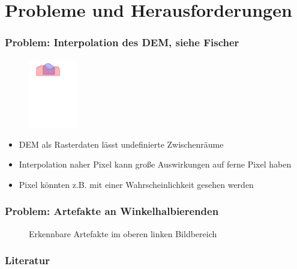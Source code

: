 \documentclass{beamer}
\begin{document}
\section{Probleme und Herausforderungen}

\begin{frame}
  \frametitle{Problem: Interpolation des DEM, siehe Fischer~\cite{fisher1993algorithm}}
  \begin{figure}[h]
    \centering
    \includegraphics[height=3cm]{interpolation}
    \label{fig:interpolation}
  \end{figure}
  \begin{itemize}[<+->]
    \item DEM als Rasterdaten lässt undefinierte Zwischenräume
    \item Interpolation naher Pixel kann große Auswirkungen auf ferne Pixel haben
    \item Pixel könnten z.B. mit einer Wahrscheinlichkeit gesehen werden
  \end{itemize}
\end{frame}

\begin{frame}
  \frametitle{Problem: Artefakte an Winkelhalbierenden}
  \begin{figure}[h]
    \centering
    \caption{Erkennbare Artefakte im oberen linken Bildbereich}
    \label{fig:bisectrix}
  \end{figure}
\end{frame}

\begin{frame}%
  \frametitle{Literatur}
  
  \small
\end{frame}
\end{document}
